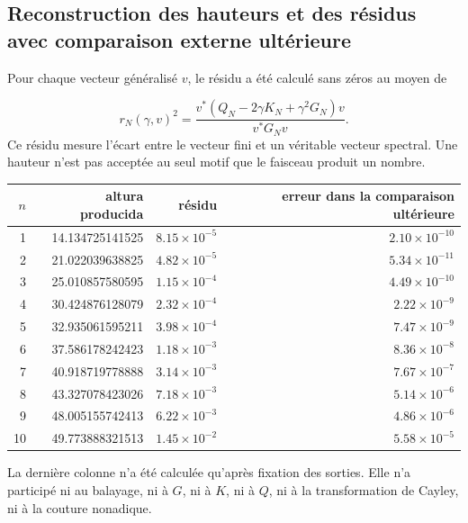 \subsection{Reconstruction des hauteurs et des résidus avec comparaison externe ultérieure}
Pour chaque vecteur généralisé \(v\), le résidu a été calculé sans zéros au moyen de\par
\[
r_N(\gamma,v)^2
=
\frac{
v^*
\left(
Q_N-2\gamma K_N+\gamma^2G_N
\right)v
}{
v^*G_Nv
}.
\]
Ce résidu mesure l'écart entre le vecteur fini et un véritable vecteur spectral. Une hauteur n'est pas acceptée au seul motif que le faisceau produit un nombre.\par
{}
\begin{center}
\small
\begin{tabularx}{\textwidth}{@{}RRRR@{}}
\toprule
\(n\) & altura producida & résidu & erreur dans la comparaison ultérieure \\
 & 14.134725141525 & \(8.15\times10^{-5}\) & \(2.10\times10^{-10}\) \\
2 & 21.022039638825 & \(4.82\times10^{-5}\) & \(5.34\times10^{-11}\) \\
3 & 25.010857580595 & \(1.15\times10^{-4}\) & \(4.49\times10^{-10}\) \\
4 & 30.424876128079 & \(2.32\times10^{-4}\) & \(2.22\times10^{-9}\) \\
5 & 32.935061595211 & \(3.98\times10^{-4}\) & \(7.47\times10^{-9}\) \\
6 & 37.586178242423 & \(1.18\times10^{-3}\) & \(8.36\times10^{-8}\) \\
7 & 40.918719778888 & \(3.14\times10^{-3}\) & \(7.67\times10^{-7}\) \\
8 & 43.327078423026 & \(7.18\times10^{-3}\) & \(5.14\times10^{-6}\) \\
9 & 48.005155742413 & \(6.22\times10^{-3}\) & \(4.86\times10^{-6}\) \\
10 & 49.773888321513 & \(1.45\times10^{-2}\) & \(5.58\times10^{-5}\) \\
\bottomrule
\end{tabularx}
\end{center}
La dernière colonne n'a été calculée qu'après fixation des sorties. Elle n'a participé ni au balayage, ni à \(G\), ni à \(K\), ni à \(Q\), ni à la transformation de Cayley, ni à la couture nonadique.\par
{}
